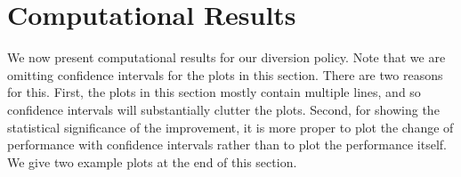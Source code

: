 \section{Computational Results}

We now present computational results for our diversion policy. Note that
we are omitting confidence intervals for the plots in this section. There
are two reasons for this. First, the plots in this section mostly
contain multiple lines, and so confidence intervals will substantially clutter
the plots. Second, for showing the statistical significance of
the improvement, it is more proper to plot the change of performance
with confidence intervals rather than to plot the performance itself.
We give two example plots at the end of this section.





